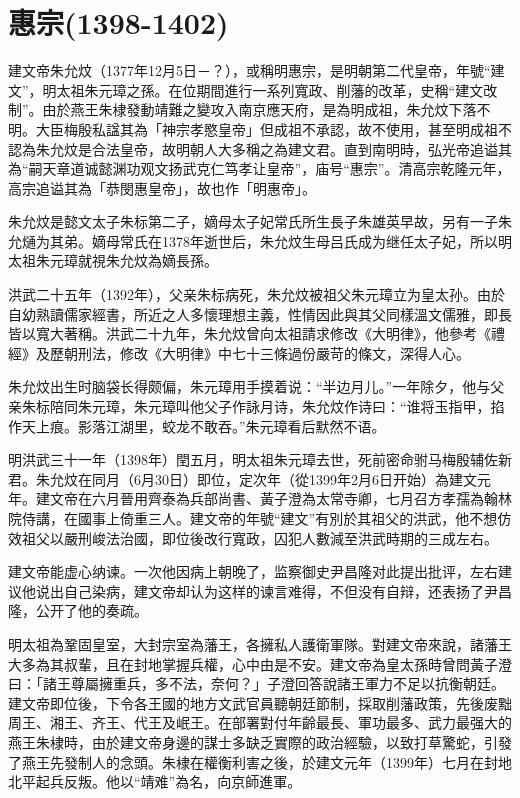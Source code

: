 
\section{惠宗\tiny(1398-1402)}

建文帝朱允炆（1377年12月5日－？），或稱明惠宗，是明朝第二代皇帝，年號“建文”，明太祖朱元璋之孫。在位期間進行一系列寬政、削藩的改革，史稱“建文改制”。由於燕王朱棣發動靖難之變攻入南京應天府，是為明成祖，朱允炆下落不明。大臣梅殷私諡其為「神宗孝愍皇帝」但成祖不承認，故不使用，甚至明成祖不認為朱允炆是合法皇帝，故明朝人大多稱之為建文君。直到南明時，弘光帝追谥其為“嗣天章道诚懿渊功观文扬武克仁笃孝让皇帝”，庙号“惠宗”。清高宗乾隆元年，高宗追谥其為「恭閔惠皇帝」，故也作「明惠帝」。

朱允炆是懿文太子朱标第二子，嫡母太子妃常氏所生長子朱雄英早故，另有一子朱允熥为其弟。嫡母常氏在1378年逝世后，朱允炆生母吕氏成为继任太子妃，所以明太祖朱元璋就視朱允炆為嫡長孫。

洪武二十五年（1392年），父亲朱标病死，朱允炆被祖父朱元璋立为皇太孙。由於自幼熟讀儒家經書，所近之人多懷理想主義，性情因此與其父同樣溫文儒雅，即長皆以寬大著稱。洪武二十九年，朱允炆曾向太祖請求修改《大明律》，他參考《禮經》及歷朝刑法，修改《大明律》中七十三條過份嚴苛的條文，深得人心。

朱允炆出生时脑袋长得颇偏，朱元璋用手摸着说：“半边月儿。”一年除夕，他与父亲朱标陪同朱元璋，朱元璋叫他父子作詠月诗，朱允炆作诗曰：“谁将玉指甲，掐作天上痕。影落江湖里，蛟龙不敢吞。”朱元璋看后默然不语。

明洪武三十一年（1398年）閏五月，明太祖朱元璋去世，死前密命驸马梅殷辅佐新君。朱允炆在同月（6月30日）即位，定次年（從1399年2月6日开始）為建文元年。建文帝在六月晉用齊泰為兵部尚書、黃子澄為太常寺卿，七月召方孝孺為翰林院侍講，在國事上倚重三人。建文帝的年號“建文”有別於其祖父的洪武，他不想仿效祖父以嚴刑峻法治國，即位後改行寬政，囚犯人數減至洪武時期的三成左右。

建文帝能虚心纳谏。一次他因病上朝晚了，监察御史尹昌隆对此提出批评，左右建议他说出自己染病，建文帝却认为这样的谏言难得，不但没有自辩，还表扬了尹昌隆，公开了他的奏疏。

明太祖為鞏固皇室，大封宗室為藩王，各擁私人護衛軍隊。對建文帝來說，諸藩王大多為其叔輩，且在封地掌握兵權，心中由是不安。建文帝為皇太孫時曾問黃子澄曰：「諸王尊屬擁重兵，多不法，奈何？」子澄回答說諸王軍力不足以抗衡朝廷。建文帝即位後，下令各王國的地方文武官員聽朝廷節制，採取削藩政策，先後废黜周王、湘王、齐王、代王及岷王。在部署對付年齡最長、軍功最多、武力最强大的燕王朱棣時，由於建文帝身邊的謀士多缺乏實際的政治經驗，以致打草驚蛇，引發了燕王先發制人的念頭。朱棣在權衡利害之後，於建文元年（1399年）七月在封地北平起兵反叛。他以“靖难”為名，向京師進軍。

